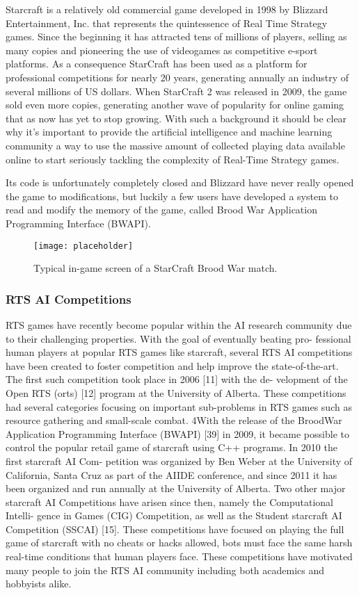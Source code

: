 Starcraft is a relatively old commercial game developed in 1998 by Blizzard
Entertainment, Inc. that represents the quintessence of Real Time Strategy
games. Since the beginning it has attracted tens of millions of players, selling
as many copies and pioneering the use of videogames as competitive e-sport
platforms. As a consequence StarCraft has been used as a platform for
professional competitions for nearly 20 years, generating annually an industry
of several millions of US dollars. When StarCraft 2 was released in 2009, the
game sold even more copies, generating another wave of popularity for online
gaming that as now has yet to stop growing. With such a background it should be
clear why it's important to provide the artificial intelligence and machine
learning community a way to use the massive amount of collected playing data
available online to start seriously tackling the complexity of Real-Time
Strategy games.

Its code is unfortunately completely closed and Blizzard have never
really opened the game to modifications, but luckily a few users have developed
a system to read and modify the memory of the game, called Brood War Application
Programming Interface (BWAPI)\cite{bwapi2011brood}.

\begin{figure}[h]
    \centering
    \texttt{[image: placeholder]}
    \caption{Typical in-game screen of a StarCraft Brood War match.}
    \label{fig:ALE}
\end{figure}

\subsubsection{RTS AI Competitions}

RTS games have recently become popular within the AI research community
due to their challenging properties. With the goal of eventually beating pro-
fessional human players at popular RTS games like starcraft, several RTS
AI competitions have been created to foster competition and help improve the
state-of-the-art. The first such competition took place in 2006 [11] with the de-
velopment of the Open RTS (orts) [12] program at the University of Alberta.
These competitions had several categories focusing on important sub-problems
in RTS games such as resource gathering and small-scale combat.
4With the release of the BroodWar Application Programming Interface
(BWAPI) [39] in 2009, it became possible to control the popular retail game
of starcraft using C++ programs. In 2010 the first starcraft AI Com-
petition was organized by Ben Weber at the University of California, Santa
Cruz as part of the AIIDE conference, and since 2011 it has been organized
and run annually at the University of Alberta. Two other major starcraft
AI Competitions have arisen since then, namely the Computational Intelli-
gence in Games (CIG) Competition, as well as the Student starcraft AI
Competition (SSCAI) [15]. These competitions have focused on playing the
full game of starcraft with no cheats or hacks allowed, bots must face the
same harsh real-time conditions that human players face. These competitions
have motivated many people to join the RTS AI community including both
academics and hobbyists alike.

